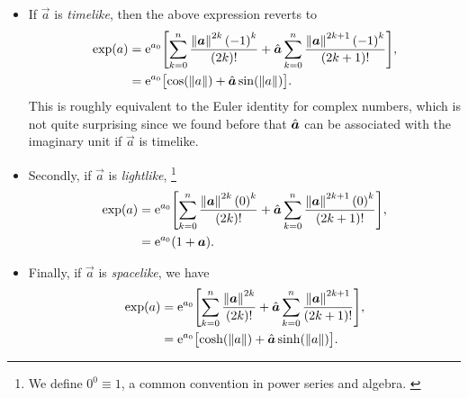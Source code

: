 \begin{itemize}
    \item If $\vec{a}$ is \emph{timelike}, then the above expression reverts to
        \begin{equation}
            \begin{split}
                \exp(a) &= \ec^{a_0}\qty[\sum_{k=0}^n \frac{\norm{\vec{a}}^{2k}\,\qty(-1)^k}{(2k)!} 
                           + \uvec{a}\sum_{k=0}^n \frac{\norm{\vec{a}}^{2k + 1} \, \qty(-1)^k}{(2k+1)!}], \\
                        &= \ec^{a_0}\qty\big[\cos(\norm{a})  + \uvec{a}\sin(\norm{a})]. \\
            \end{split}
        \end{equation}
        This is roughly equivalent to the Euler identity for complex numbers, which is not quite surprising since we found before that $\uvec{a}$ can be associated with the imaginary unit if $\vec{a}$ is timelike.
    \item Secondly, if $\vec{a}$ is \emph{lightlike}, \footnote{We define $0^0 \equiv 1$, a common convention in power series and algebra. \cite{Graham1994}}
        \begin{equation}
            \begin{split}
                \exp(a) &= \ec^{a_0}\qty[\sum_{k=0}^n \frac{\norm{\vec{a}}^{2k}\,\qty(0)^k}{(2k)!} 
                           + \uvec{a}\sum_{k=0}^n \frac{\norm{\vec{a}}^{2k + 1} \, \qty(0)^k}{(2k+1)!}], \\
                        &= \ec^{a_0}\qty(1 + \vec{a}). \\
            \end{split}
        \end{equation}
    \item Finally, if $\vec{a}$ is \emph{spacelike}, we have
        \begin{equation}
            \begin{split}
                \exp(a) &= \ec^{a_0}\qty[\sum_{k=0}^n \frac{\norm{\vec{a}}^{2k}}{(2k)!} 
                           + \uvec{a}\sum_{k=0}^n \frac{\norm{\vec{a}}^{2k + 1}}{(2k+1)!}], \\
                        &= \ec^{a_0}\qty\big[\cosh(\norm{a}) + \uvec{a}\sinh(\norm{a})]. \\
            \end{split}
        \end{equation}
\end{itemize}
